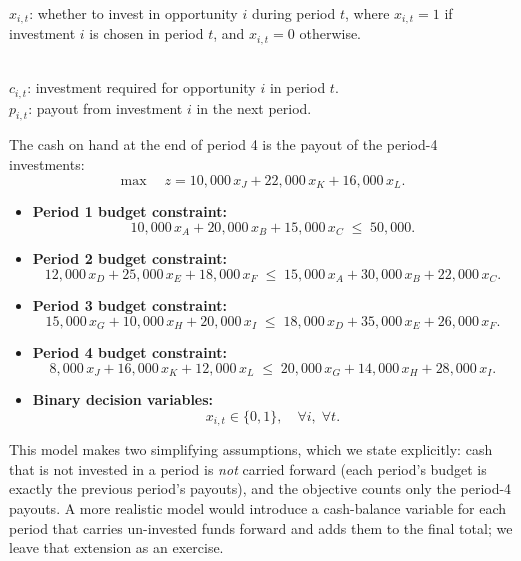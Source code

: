 \begin{solution}

 \\
$x_{i,t}$: whether to invest in opportunity $i$ during period $t$, where $x_{i,t} = 1$ if investment $i$ is chosen in period $t$, and $x_{i,t} = 0$ otherwise.

 \\
$c_{i,t}$: investment required for opportunity $i$ in period $t$. \\
$p_{i,t}$: payout from investment $i$ in the next period.

\smallskip {} The cash on hand at the end of period 4 is the payout of the period-4 investments:
\[
\max \quad z = 10{,}000\,x_{J} + 22{,}000\,x_{K} + 16{,}000\,x_{L}.
\]

\smallskip {}
\begin{itemize}
\item \textbf{Period 1 budget constraint:}
\[
10{,}000\,x_A + 20{,}000\,x_B + 15{,}000\,x_C \;\leq\; 50{,}000.
\]
\item \textbf{Period 2 budget constraint:}
\[
12{,}000\,x_D + 25{,}000\,x_E + 18{,}000\,x_F \;\leq\; 15{,}000\,x_A + 30{,}000\,x_B + 22{,}000\,x_C.
\]
\item \textbf{Period 3 budget constraint:}
\[
15{,}000\,x_G + 10{,}000\,x_H + 20{,}000\,x_I \;\leq\; 18{,}000\,x_D + 35{,}000\,x_E + 26{,}000\,x_F.
\]
\item \textbf{Period 4 budget constraint:}
\[
8{,}000\,x_J + 16{,}000\,x_K + 12{,}000\,x_L \;\leq\; 20{,}000\,x_G + 14{,}000\,x_H + 28{,}000\,x_I.
\]
\item \textbf{Binary decision variables:}
\[
x_{i,t} \in \{0,1\}, \quad \forall i,\; \forall t.
\]
\end{itemize}

This model makes two simplifying assumptions, which we state explicitly: cash that is not invested in a period is \emph{not} carried forward (each period's budget is exactly the previous period's payouts), and the objective counts only the period-4 payouts. A more realistic model would introduce a cash-balance variable for each period that carries un-invested funds forward and adds them to the final total; we leave that extension as an exercise.


\end{solution}

